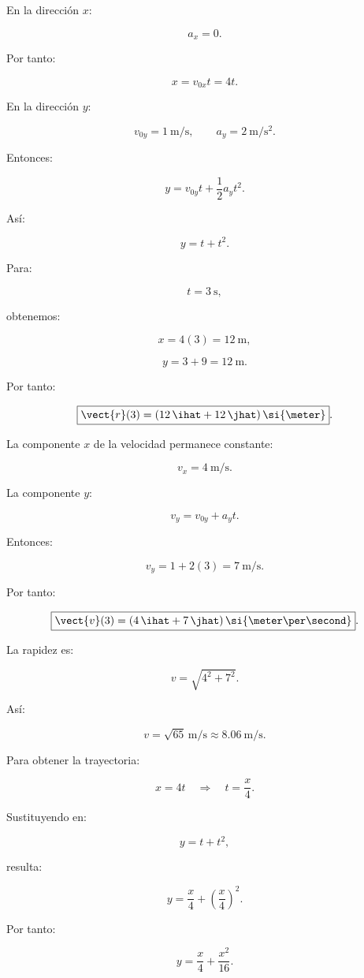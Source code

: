 \begin{explicacion}
En la dirección \(x\):

\[
a_x=0.
\]

Por tanto:

\[
x=v_{0x}t=4t.
\]

En la dirección \(y\):

\[
v_{0y}=\SI{1}{\meter\per\second},
\qquad
a_y=\SI{2}{\meter\per\second\squared}.
\]

Entonces:

\[
y
=
v_{0y}t+\frac{1}{2}a_yt^2.
\]

Así:

\[
y=t+t^2.
\]

Para:

\[
t=\SI{3}{\second},
\]

obtenemos:

\[
x=4(3)=\SI{12}{\meter},
\]

\[
y=3+9=\SI{12}{\meter}.
\]

Por tanto:

\[
\boxed{
\vect{r}(3)
=
(12\,\ihat+12\,\jhat)\,\si{\meter}
}.
\]

La componente \(x\) de la velocidad permanece constante:

\[
v_x=\SI{4}{\meter\per\second}.
\]

La componente \(y\):

\[
v_y
=
v_{0y}+a_yt.
\]

Entonces:

\[
v_y
=
1+2(3)
=
\SI{7}{\meter\per\second}.
\]

Por tanto:

\[
\boxed{
\vect{v}(3)
=
(4\,\ihat+7\,\jhat)\,
\si{\meter\per\second}
}.
\]

La rapidez es:

\[
v
=
\sqrt{4^2+7^2}.
\]

Así:

\[
\boxed{
v=\sqrt{65}\,\si{\meter\per\second}
\approx
\SI{8.06}{\meter\per\second}
}.
\]

Para obtener la trayectoria:

\[
x=4t
\quad\Longrightarrow\quad
t=\frac{x}{4}.
\]

Sustituyendo en:

\[
y=t+t^2,
\]

resulta:

\[
y
=
\frac{x}{4}
+
\left(\frac{x}{4}\right)^2.
\]

Por tanto:

\[
\boxed{
y=\frac{x}{4}+\frac{x^2}{16}
}.
\]
\end{explicacion}



